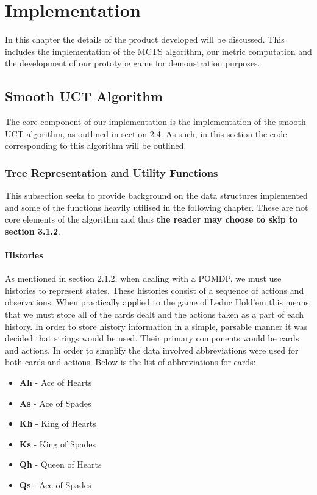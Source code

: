 \chapter{Implementation}\label{ch:development}
In this chapter the details of the product developed will be discussed.
This includes the implementation of the MCTS algorithm, our metric computation and
the development of our prototype game for demonstration purposes.


\section{Smooth UCT Algorithm}\label{sec:MCTS}
The core component of our implementation is the implementation of the smooth UCT algorithm, as
outlined in section 2.4.
As such, in this section the code corresponding to this algorithm will be outlined.

\subsection{Tree Representation and Utility Functions}\label{subsec:treeRepresentation}
This subsection seeks to provide background on the data structures implemented and some
of the functions heavily utilised in the following chapter.
These are not core elements of the algorithm and thus \textbf{the reader may choose to skip
to section 3.1.2}.

\subsubsection{Histories}
As mentioned in section 2.1.2, when dealing with a POMDP, we must use histories to represent states.
These histories consist of a sequence of actions and observations\citep{silver2010monte}.
When practically applied to the game of Leduc Hold'em this means that we must store all of the
cards dealt and the actions taken as a part of each history.
In order to store history information in a simple, parsable manner it was decided that strings would be used.
Their primary components would be cards and actions.
In order to simplify the data involved abbreviations were used for both cards and actions.
Below is the list of abbreviations for cards:

\begin{itemize}
    \item \textbf{Ah} - Ace of Hearts
    \item \textbf{As} - Ace of Spades
    \item \textbf{Kh} - King of Hearts
    \item \textbf{Ks} - King of Spades
    \item \textbf{Qh} - Queen of Hearts
    \item \textbf{Qs} - Ace of Spades
\end{itemize}

